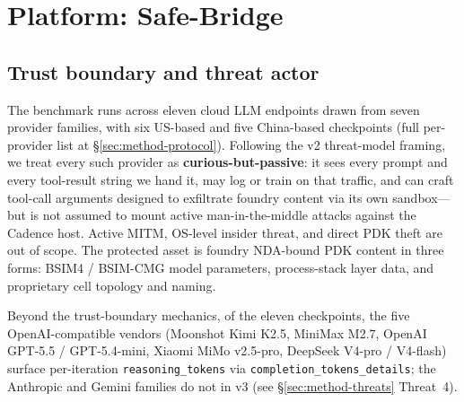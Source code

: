 
\section{Platform: Safe-Bridge}
\label{sec:platform}

\subsection{Trust boundary and threat actor}
\label{sec:platform-threat}

The benchmark runs across eleven cloud LLM endpoints drawn from
seven provider families, with six US-based and five China-based
checkpoints (full per-provider list at
\S\ref{sec:method-protocol}). Following
the v2 threat-model framing, we treat every such provider as
\textbf{curious-but-passive}: it sees every prompt and every
tool-result string we hand it, may log or train on that traffic,
and can craft tool-call arguments designed to exfiltrate foundry
content via its own sandbox---but is not assumed to mount active
man-in-the-middle attacks against the Cadence host. Active MITM,
OS-level insider threat, and direct PDK theft are out of scope.
The protected asset is foundry NDA-bound PDK content in three
forms: BSIM4 / BSIM-CMG model parameters, process-stack layer
data, and proprietary cell topology and naming.

Beyond the trust-boundary mechanics, of the eleven checkpoints,
the five OpenAI-compatible vendors
(Moonshot Kimi K2.5, MiniMax M2.7, OpenAI GPT-5.5 / GPT-5.4-mini,
Xiaomi MiMo v2.5-pro, DeepSeek V4-pro / V4-flash) surface
per-iteration \texttt{reasoning\_tokens} via
\texttt{completion\_tokens\_details}; the Anthropic and Gemini
families do not in v3 (see \S\ref{sec:method-threats} Threat~4).

